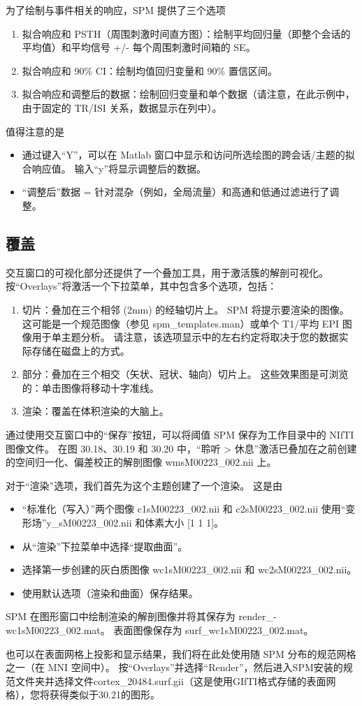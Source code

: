 为了绘制与事件相关的响应，SPM 提供了三个选项

\begin{enumerate}
	\item 拟合响应和 PSTH（周围刺激时间直方图）：绘制平均回归量（即整个会话的平均值）和平均信号 +/- 每个周围刺激时间箱的 SE。
	\item 拟合响应和 90\% CI：绘制均值回归变量和 90\% 置信区间。
	\item 拟合响应和调整后的数据：绘制回归变量和单个数据（请注意，在此示例中，由于固定的 TR/ISI 关系，数据显示在列中）。
\end{enumerate}

值得注意的是

\begin{itemize}
	\item 通过键入“Y”，可以在 Matlab 窗口中显示和访问所选绘图的跨会话/主题的拟合响应值。 输入“y”将显示调整后的数据。
	\item “调整后”数据 = 针对混杂（例如，全局流量）和高通和低通过滤进行了调整。
\end{itemize}

\subsection{覆盖}

交互窗口的可视化部分还提供了一个叠加工具，用于激活簇的解剖可视化。 按“Overlays”将激活一个下拉菜单，其中包含多个选项，包括：

\begin{enumerate}
	\item 切片：叠加在三个相邻 (2mm) 的经轴切片上。 SPM 将提示要渲染的图像。 这可能是一个规范图像（参见 spm\_templates.man）或单个 T1/平均 EPI 图像用于单主题分析。 请注意，该选项显示中的左右约定将取决于您的数据实际存储在磁盘上的方式。
	\item 部分：叠加在三个相交（矢状、冠状、轴向）切片上。 这些效果图是可浏览的：单击图像将移动十字准线。
	\item 渲染：覆盖在体积渲染的大脑上。
\end{enumerate}

通过使用交互窗口中的“保存”按钮，可以将阈值 SPM 保存为工作目录中的 NIfTI 图像文件。 在图 30.18、30.19 和 30.20 中，“聆听 > 休息”激活已叠加在之前创建的空间归一化、偏差校正的解剖图像 wmsM00223\_002.nii 上。

对于“渲染”选项，我们首先为这个主题创建了一个渲染。 这是由

\begin{itemize}
	\item “标准化（写入）”两个图像 c1sM00223\_002.nii 和 c2sM00223\_002.nii 使用“变形场”y\_sM00223\_002.nii 和体素大小 [1 1 1]。
	\item 从“渲染”下拉菜单中选择“提取曲面”。
	\item 选择第一步创建的灰白质图像 wc1sM00223\_002.nii 和 wc2sM00223\_002.nii。
	\item 使用默认选项（渲染和曲面）保存结果。
\end{itemize}

SPM 在图形窗口中绘制渲染的解剖图像并将其保存为 render\_-wc1sM00223\_002.mat。 表面图像保存为 surf\_wc1sM00223\_002.mat。

也可以在表面网格上投影和显示结果，我们将在此处使用随 SPM 分布的规范网格之一（在 MNI 空间中）。 按“Overlays”并选择“Render”，然后进入SPM安装的规范文件夹并选择文件cortex\_20484.surf.gii（这是使用GIfTI格式存储的表面网格），您将获得类似于30.21的图形。


